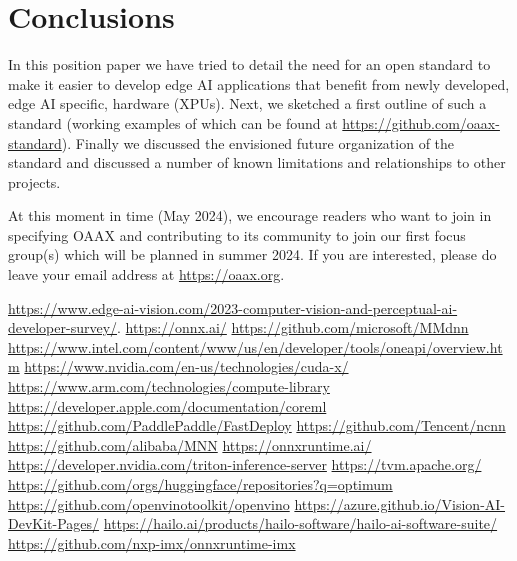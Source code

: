 \documentclass{article}
\newcommand{\oaaxweb}{\href{https://oaax.org}{https://oaax.org}}
\newcommand{\oaaxgit}{\href{https://github.com/oaax-standard}{https://github.com/oaax-standard}}
\begin{document}
\section{Conclusions}

In this position paper we have tried to detail the need for an open standard to make it easier to develop edge AI applications that benefit from newly developed, edge AI specific, hardware (XPUs). Next, we sketched a first outline of such a standard (working examples of which can be found at \oaaxgit). Finally we discussed the envisioned future organization of the standard and discussed a number of known limitations and relationships to other projects.

At this moment in time (May 2024), we encourage readers who want to join in specifying OAAX and contributing to its community to join our first focus group(s) which will be planned in summer 2024. If you are interested, please do leave your email address at \oaaxweb.

\begin{thebibliography}{9}

	 \href{https://www.edge-ai-vision.com/2023-computer-vision-and-perceptual-ai-developer-survey/}{https://www.edge-ai-vision.com/2023-computer-vision-and-perceptual-ai-developer-survey/}.
	 \href{https://onnx.ai/}{https://onnx.ai/}
	\href{https://github.com/microsoft/MMdnn}{https://github.com/microsoft/MMdnn}
	\href{https://www.intel.com/content/www/us/en/developer/tools/oneapi/overview.html}{https://www.intel.com/content/www/us/en/developer/tools/oneapi/overview.htm}
	\href{https://www.nvidia.com/en-us/technologies/cuda-x/}{https://www.nvidia.com/en-us/technologies/cuda-x/}
	\href{https://www.arm.com/technologies/compute-library}{https://www.arm.com/technologies/compute-library}
	\href{https://developer.apple.com/documentation/coreml}{https://developer.apple.com/documentation/coreml}
	\href{https://github.com/PaddlePaddle/FastDeploy}{https://github.com/PaddlePaddle/FastDeploy}
	\href{https://github.com/Tencent/ncnn}{https://github.com/Tencent/ncnn}
	\href{https://github.com/alibaba/MNN}{https://github.com/alibaba/MNN}
	\href{https://onnxruntime.ai/}{https://onnxruntime.ai/}
	\href{https://developer.nvidia.com/triton-inference-server}{https://developer.nvidia.com/triton-inference-server}
	\href{https://tvm.apache.org/}{https://tvm.apache.org/}
	\href{https://github.com/orgs/huggingface/repositories?q=optimum}{https://github.com/orgs/huggingface/repositories?q=optimum}
	\href{https://github.com/openvinotoolkit/openvino}{https://github.com/openvinotoolkit/openvino}
	\href{https://azure.github.io/Vision-AI-DevKit-Pages/}{https://azure.github.io/Vision-AI-DevKit-Pages/}
	\href{https://hailo.ai/products/hailo-software/hailo-ai-software-suite/}{https://hailo.ai/products/hailo-software/hailo-ai-software-suite/}
	\href{https://github.com/nxp-imx/onnxruntime-imx}{https://github.com/nxp-imx/onnxruntime-imx}


\end{thebibliography}
\end{document}
